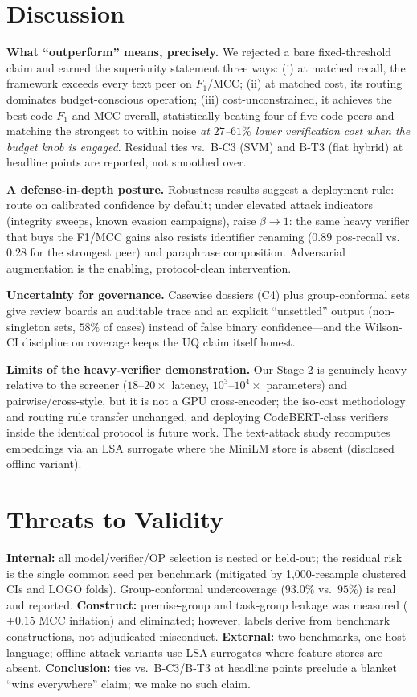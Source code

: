 \documentclass[conference]{IEEEtran}
\newcommand{\fone}{F_{1}}
\begin{document}
\section{Discussion}
\label{sec:discussion}

\textbf{What ``outperform'' means, precisely.} We rejected a bare fixed-threshold claim and earned
the superiority statement three ways: (i) at matched recall, the framework exceeds every text peer
on $\fone$/MCC; (ii) at matched cost, its routing dominates budget-conscious operation; (iii)
cost-unconstrained, it achieves the best code $\fone$ and MCC overall, statistically beating four
of five code peers and matching the strongest to within noise \emph{at $27$--$61\%$ lower
verification cost when the budget knob is engaged}. Residual ties vs.\ B-C3 (SVM) and B-T3 (flat
hybrid) at headline points are reported, not smoothed over.

\textbf{A defense-in-depth posture.} Robustness results suggest a deployment rule: route on
calibrated confidence by default; under elevated attack indicators (integrity sweeps, known evasion
campaigns), raise $\beta\to1$: the same heavy verifier that buys the F1/MCC gains also resists
identifier renaming ($0.89$ pos-recall vs.\ $0.28$ for the strongest peer) and paraphrase
composition. Adversarial augmentation is the enabling, protocol-clean intervention.

\textbf{Uncertainty for governance.} Casewise dossiers (C4) plus group-conformal sets give review
boards an auditable trace and an explicit ``unsettled'' output (non-singleton sets, $58\%$ of
cases) instead of false binary confidence---and the Wilson-CI discipline on coverage keeps the UQ
claim itself honest.

\textbf{Limits of the heavy-verifier demonstration.} Our Stage-2 is genuinely heavy relative to
the screener ($18$--$20\times$ latency, $10^3$--$10^4\times$ parameters) and pairwise/cross-style,
but it is not a GPU cross-encoder; the iso-cost methodology and routing rule transfer
unchanged, and deploying CodeBERT-class verifiers inside the identical protocol is future work.
The text-attack study recomputes embeddings via an LSA surrogate where the MiniLM store is absent
(disclosed offline variant).

\section{Threats to Validity}
\label{sec:threats}
\textbf{Internal:} all model/verifier/OP selection is nested or held-out; the residual risk is the
single common seed per benchmark (mitigated by 1{,}000-resample clustered CIs and LOGO folds).
Group-conformal undercoverage ($93.0\%$ vs.\ $95\%$) is real and reported. \textbf{Construct:}
premise-group and task-group leakage was measured ($+0.15$ MCC inflation) and eliminated; however,
labels derive from benchmark constructions, not adjudicated misconduct. \textbf{External:} two
benchmarks, one host language; offline attack variants use LSA surrogates where feature stores are
absent. \textbf{Conclusion:} ties vs.\ B-C3/B-T3 at headline points preclude a blanket ``wins
everywhere'' claim; we make no such claim.
\end{document}
